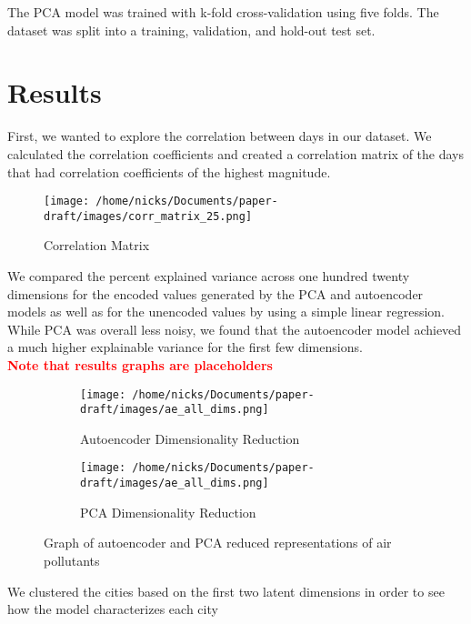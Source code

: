 \documentclass{article}
\newcommand\note[1]{\textbf{\textcolor{red}{#1}}}
\begin{document}
The PCA model was trained with k-fold cross-validation using five folds. The dataset was
split into a training, validation, and hold-out test set.

\section{Results}
First, we wanted to explore the correlation between days in our dataset. We calculated
the correlation coefficients and created a correlation matrix of the days that had
correlation coefficients of the highest magnitude.\par

\begin{figure}[h]
\texttt{[image: /home/nicks/Documents/paper-draft/images/corr\_matrix\_25.png]}
\caption{Correlation Matrix}
\label{fig:pipeline}
\end{figure}

We compared the percent explained variance across one hundred twenty dimensions for
the encoded values generated by the PCA and autoencoder models as well as for the unencoded
values by using a simple linear regression. While PCA was overall less noisy, we found that
the autoencoder model achieved a much higher explainable variance for the first few dimensions.
\\ \note{Note that results graphs are placeholders}
\begin{figure}[h!]

\begin{subfigure}{0.5\textwidth}
    \texttt{[image: /home/nicks/Documents/paper-draft/images/ae\_all\_dims.png]} 
    \caption{Autoencoder Dimensionality Reduction}
    \label{fig:ae_dim_reduction}
\end{subfigure}%
\begin{subfigure}{0.5\textwidth}
    \texttt{[image: /home/nicks/Documents/paper-draft/images/ae\_all\_dims.png]}
    \caption{PCA Dimensionality Reduction}
    \label{fig:pca_dim_reduction}
\end{subfigure}

\caption{Graph of autoencoder and PCA reduced representations of air pollutants}
\label{fig:ae_vs_pca}
\end{figure}

\par We clustered the cities based on the first two latent dimensions in order to see how
the model characterizes each city
\end{document}
